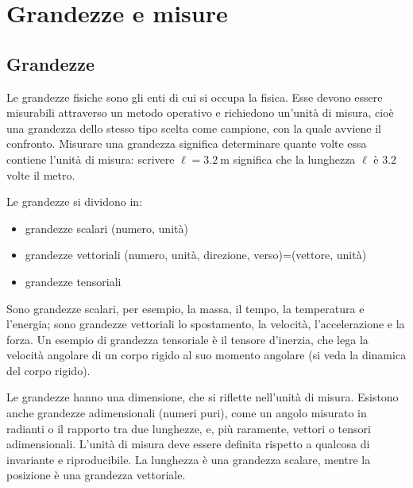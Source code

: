 \chapter{Grandezze e misure}
\minitoc
\section{Grandezze}
Le grandezze fisiche sono gli enti di cui si occupa la fisica. Esse devono essere misurabili attraverso un metodo operativo e richiedono un'unità di misura, cioè una grandezza dello stesso tipo scelta come campione, con la quale avviene il confronto. Misurare una grandezza significa determinare quante volte essa contiene l'unità di misura: scrivere $\ell=\SI{3.2}{\meter}$ significa che la lunghezza $\ell$ è $3.2$ volte il metro.
\newline\par
Le grandezze si dividono in:
\begin{itemize}
  \item{}grandezze scalari (numero, unità)
  \item{}grandezze vettoriali
  (numero, unità, direzione, verso)=(vettore, unità)
  \item{}grandezze tensoriali
\end{itemize}
Sono grandezze scalari, per esempio, la massa, il tempo, la temperatura e l'energia; sono grandezze vettoriali lo spostamento, la velocità, l'accelerazione e la forza. Un esempio di grandezza tensoriale è il tensore d'inerzia, che lega la velocità angolare di un corpo rigido al suo momento angolare (si veda la dinamica del corpo rigido).

Le grandezze hanno una dimensione, che si riflette nell'unità di misura. Esistono anche grandezze adimensionali (numeri puri), come un angolo misurato in radianti o il rapporto tra due lunghezze, e, più raramente, vettori o tensori adimensionali. L'unità di misura deve essere definita rispetto a qualcosa di invariante e riproducibile. La lunghezza è una grandezza scalare, mentre la posizione è una grandezza vettoriale.

